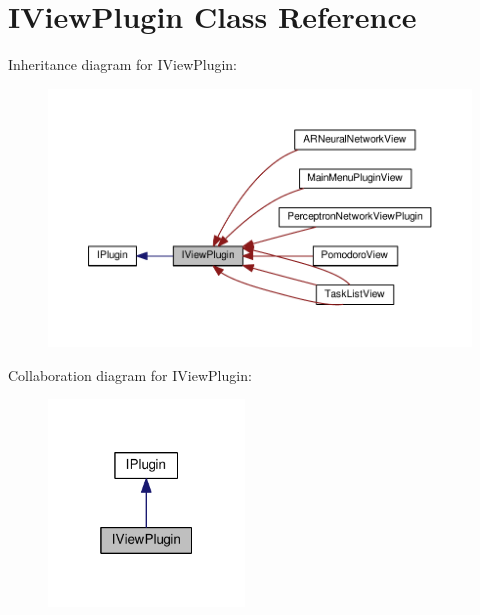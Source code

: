 \hypertarget{class_i_view_plugin}{}\section{I\+View\+Plugin Class Reference}
\label{class_i_view_plugin}


Inheritance diagram for I\+View\+Plugin\+:\nopagebreak
\begin{figure}[H]
\begin{center}
\leavevmode
\includegraphics[width=350pt]{class_i_view_plugin__inherit__graph}
\end{center}
\end{figure}


Collaboration diagram for I\+View\+Plugin\+:\nopagebreak
\begin{figure}[H]
\begin{center}
\leavevmode
\includegraphics[width=148pt]{class_i_view_plugin__coll__graph}
\end{center}
\end{figure}
